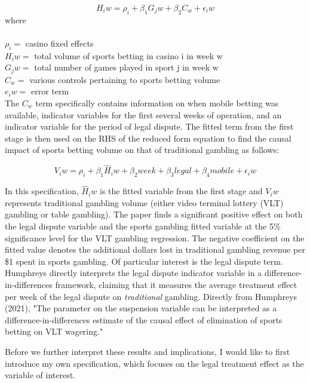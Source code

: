 \documentclass{article}
\begin{document}
\begin{equation}
    H_iw = \rho_i + \beta_1G_jw + \beta_2C_w + \epsilon_iw
\end{equation}
where\\
\\$\rho_i =$ casino fixed effects\\
$H_iw =$ total volume of sports betting in casino i in week w\\
$G_jw =$ total number of games played in sport j in week w\\
$C_w =$ various controls pertaining to sports betting volume\\
$e_iw =$ error term\\

The $C_w$ term specifically contains information on when mobile betting was available, indicator variables for the first several weeks of operation, and an indicator variable for the period of legal dispute. The fitted term from the first stage is then used on the RHS of the reduced form equation to find the causal impact of sports betting volume on that of traditional gambling as follows:

\begin{equation}
    V_iw = \rho_i + \beta_1\hat{H}_iw + \beta_2week + \beta_3legal + \beta_4mobile + \epsilon_iw
\end{equation}

In this specification, $\hat{H}_iw$ is the fitted variable from the first stage and $V_iw$ represents traditional gambling volume (either video terminal lottery (VLT) gambling or table gambling). The paper finds a significant positive effect on both the legal dispute variable and the sports gambling fitted variable at the 5\% significance level for the VLT gambling regression. The negative coefficient on the fitted value denotes the additional dollars lost in traditional gambling revenue per \$1 spent in sports gambling. Of particular interest is the legal dispute term. Humphreys directly interprets the legal dispute indicator variable in a difference-in-differences framework, claiming that it measures the average treatment effect per week of the legal dispute on \textit{traditional} gambling. Directly from Humphreys (2021\cite{Humphreys2021}), "The parameter on the suspension variable can be interpreted as a difference-in-differences estimate of the causal effect of elimination of sports betting on VLT wagering."

Before we further interpret these results and implications, I would like to first introduce my own specification, which focuses on the legal treatment effect as the variable of interest.
\end{document}
